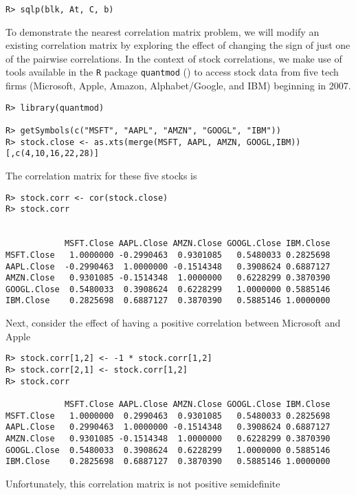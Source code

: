 \documentclass{article}
\begin{document}
\begin{verbatim}
R> sqlp(blk, At, C, b)
\end{verbatim}

To demonstrate the nearest correlation matrix problem, we will modify an existing correlation matrix by exploring the effect of changing the sign of just one of the pairwise correlations. In the context of stock correlations, we make use of tools available in the \verb!R! package \verb!quantmod! (\cite{quantmod}) to access stock data from five tech firms (Microsoft, Apple, Amazon, Alphabet/Google, and IBM) beginning in 2007.

\begin{verbatim}
R> library(quantmod)

R> getSymbols(c("MSFT", "AAPL", "AMZN", "GOOGL", "IBM"))
R> stock.close <- as.xts(merge(MSFT, AAPL, AMZN, GOOGL,IBM))[,c(4,10,16,22,28)]
\end{verbatim}

The correlation matrix for these five stocks is

\begin{verbatim}
R> stock.corr <- cor(stock.close)
R> stock.corr


            MSFT.Close AAPL.Close AMZN.Close GOOGL.Close IBM.Close
MSFT.Close   1.0000000 -0.2990463  0.9301085   0.5480033 0.2825698
AAPL.Close  -0.2990463  1.0000000 -0.1514348   0.3908624 0.6887127
AMZN.Close   0.9301085 -0.1514348  1.0000000   0.6228299 0.3870390
GOOGL.Close  0.5480033  0.3908624  0.6228299   1.0000000 0.5885146
IBM.Close    0.2825698  0.6887127  0.3870390   0.5885146 1.0000000
\end{verbatim}

Next, consider the effect of having a positive correlation between Microsoft and Apple

\begin{verbatim}
R> stock.corr[1,2] <- -1 * stock.corr[1,2]
R> stock.corr[2,1] <- stock.corr[1,2]
R> stock.corr

            MSFT.Close AAPL.Close AMZN.Close GOOGL.Close IBM.Close
MSFT.Close   1.0000000  0.2990463  0.9301085   0.5480033 0.2825698
AAPL.Close   0.2990463  1.0000000 -0.1514348   0.3908624 0.6887127
AMZN.Close   0.9301085 -0.1514348  1.0000000   0.6228299 0.3870390
GOOGL.Close  0.5480033  0.3908624  0.6228299   1.0000000 0.5885146
IBM.Close    0.2825698  0.6887127  0.3870390   0.5885146 1.0000000
\end{verbatim}

Unfortunately, this correlation matrix is not positive semidefinite
\end{document}
